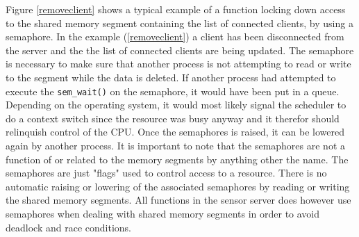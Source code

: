 \documentclass[12pt,english,a4paper]{report}
\begin{document}
Figure \ref{removeclient} shows a typical example of a function locking down access to the shared memory segment containing the list of connected clients, by using a semaphore. In the example (\ref{removeclient}) a client has been disconnected from the server and the the list of connected clients are being updated. The semaphore is necessary to make sure that another process is not attempting to read or write to the segment while the data is deleted. If another process had attempted to execute the \texttt{sem\_wait()} on the semaphore, it would have been put in a queue. Depending on the operating system, it would most likely signal the scheduler to do a context switch since the resource was busy anyway and it therefor should relinquish control of the CPU. Once the semaphores is raised, it can be lowered again by another process. It is important to note that the semaphores are not a function of or related to the memory segments by anything other the name. The semaphores are just "flags" used to control access to a resource. There is no automatic raising or lowering of the associated semaphores by reading or writing the shared memory segments. All functions in the sensor server does however use semaphores when dealing with shared memory segments in order to avoid deadlock and race conditions.
\end{document}

